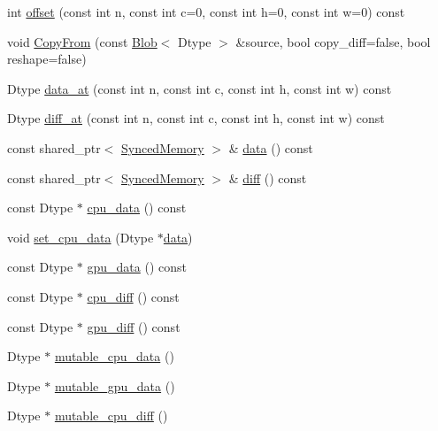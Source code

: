 \begin{DoxyCompactItemize}
\item 
int \hyperlink{classcaffe_1_1_blob_a87022dfa6cc45b3a2727ccce9ccf4b2c}{offset} (const int n, const int c=0, const int h=0, const int w=0) const 
\item 
void \hyperlink{classcaffe_1_1_blob_a64ad51f99e88233f43a21a85ebe10284}{Copy\+From} (const \hyperlink{classcaffe_1_1_blob}{Blob}$<$ Dtype $>$ \&source, bool copy\+\_\+diff=false, bool reshape=false)
\item 
Dtype \hyperlink{classcaffe_1_1_blob_a3f12332d9d8a0a5adc12c8c75bbbd335}{data\+\_\+at} (const int n, const int c, const int h, const int w) const 
\item 
Dtype \hyperlink{classcaffe_1_1_blob_a349ee9442e5ba9736b6ccf12359e776e}{diff\+\_\+at} (const int n, const int c, const int h, const int w) const 
\item 
const shared\+\_\+ptr$<$ \hyperlink{classcaffe_1_1_synced_memory}{Synced\+Memory} $>$ \& \hyperlink{classcaffe_1_1_blob_a09d1435056f21ba9df52cee4d6371087}{data} () const 
\item 
const shared\+\_\+ptr$<$ \hyperlink{classcaffe_1_1_synced_memory}{Synced\+Memory} $>$ \& \hyperlink{classcaffe_1_1_blob_ab7a8c2034a34695fe5f777ff3271e80d}{diff} () const 
\item 
const Dtype $\ast$ \hyperlink{classcaffe_1_1_blob_a490e0b609d0d62dbfc317cbe76aa8fa2}{cpu\+\_\+data} () const 
\item 
void \hyperlink{classcaffe_1_1_blob_a5d7d38b157e43ff6a8b8bf94b6815daf}{set\+\_\+cpu\+\_\+data} (Dtype $\ast$\hyperlink{classcaffe_1_1_blob_a09d1435056f21ba9df52cee4d6371087}{data})
\item 
const Dtype $\ast$ \hyperlink{classcaffe_1_1_blob_afd60f6fa2044997149075817991bfc19}{gpu\+\_\+data} () const 
\item 
const Dtype $\ast$ \hyperlink{classcaffe_1_1_blob_a59dc87d97e8a0db8302b142eacb64e10}{cpu\+\_\+diff} () const 
\item 
const Dtype $\ast$ \hyperlink{classcaffe_1_1_blob_aafcc1d137ff67dea2d65824ce67bb21d}{gpu\+\_\+diff} () const 
\item 
Dtype $\ast$ \hyperlink{classcaffe_1_1_blob_ac170c040c34e2e78e7fc0d2ee12cf0ef}{mutable\+\_\+cpu\+\_\+data} ()
\item 
Dtype $\ast$ \hyperlink{classcaffe_1_1_blob_abac6bde0521e019df173213af6808e3b}{mutable\+\_\+gpu\+\_\+data} ()
\item 
Dtype $\ast$ \hyperlink{classcaffe_1_1_blob_a4eb870499aa659a5eee7af622cd92eca}{mutable\+\_\+cpu\+\_\+diff} ()
\item 

\end{DoxyCompactItemize}
